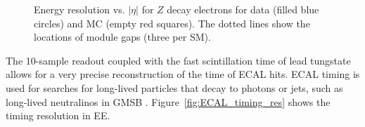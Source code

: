 \documentclass[dissertation.tex]{subfiles}
\begin{document}
\begin{figure}
	\centering
	\hspace{1cm}
	\caption{Energy resolution vs. $|\eta|$ for $Z$ decay electrons for data (filled blue circles) and MC (empty red squares).  The dotted lines show the locations of module gaps (three per SM).}
	\label{fig:ECAL_res_vs_eta}
\end{figure}

The 10-sample readout coupled with the fast scintillation time of lead tungstate allows for a very precise reconstruction of the time of ECAL hits.  ECAL timing is used for searches for long-lived particles that decay to photons or jets, such as long-lived neutralinos in GMSB \cite{long-lived_GMSB_paper}.  Figure~\ref{fig:ECAL_timing_res} shows the timing resolution in EE.
\end{document}
